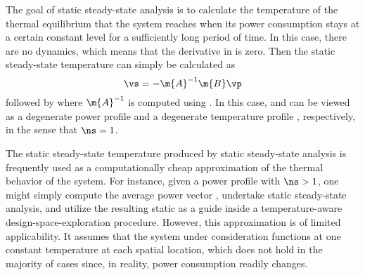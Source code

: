 The goal of static steady-state analysis is to calculate the temperature of the
thermal equilibrium that the system reaches when its power consumption stays at
a certain constant level \vp for a sufficiently long period of time. In this
case, there are no dynamics, which means that the derivative in
 is zero. Then the static steady-state
temperature \vq can simply be calculated as
\[
  \vs = -\m{A}^{-1} \m{B} \vp
\]
followed by  where $\m{A}^{-1}$ is computed using
. In this case, \vp and \vq can be viewed as a degenerate
power profile \mp and a degenerate temperature profile \mq, respectively, in the
sense that $\ns = 1$.

The static steady-state temperature produced by static steady-state analysis is
frequently used as a computationally cheap approximation of the thermal behavior
of the system. For instance, given a power profile \mp with $\ns > 1$, one might
simply compute the average power vector \vp, undertake static steady-state
analysis, and utilize the resulting static \vq as a guide inside a
temperature-aware design-space-exploration procedure. However, this
approximation is of limited applicability. It assumes that the system under
consideration functions at one constant temperature at each spatial location,
which does not hold in the majority of cases since, in reality, power
consumption readily changes.

